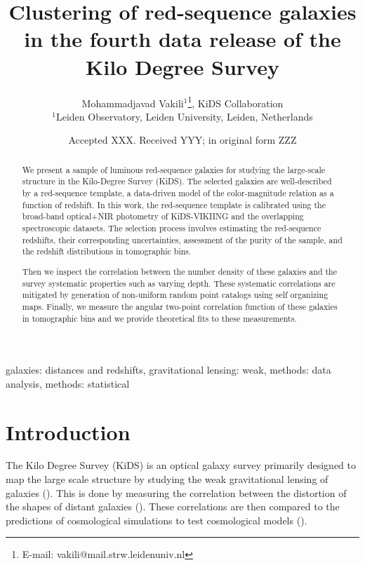\documentclass[fleqn,usenatbib,useAMS]{mnras}
\title[KiDS LRGs]{Clustering of red-sequence galaxies in the fourth data release of the Kilo Degree Survey}
\author[M. Vakili et al.]{
Mohammadjavad Vakili$^{1}$\thanks{E-mail: vakili@mail.strw.leidenuniv.nl}, KiDS Collaboration\\
$^{1}$Leiden Observatory, Leiden University, Leiden, Netherlands
}
\date{Accepted XXX. Received YYY; in original form ZZZ}
\begin{document}
\label{firstpage}
\pagerange{\pageref{firstpage}--\pageref{lastpage}}
\maketitle

\begin{abstract}

We present a sample of luminous red-sequence galaxies for studying the large-scale structure in the Kilo-Degree Survey (KiDS). The selected galaxies are well-described by a red-sequence template, a data-driven model of the color-magnitude relation as a function of redshift. In this work, the red-sequence template is calibrated using the broad-band optical+NIR photometry of KiDS-VIKIING and the overlapping spectroscopic datasets.    
The selection process involves estimating the red-sequence redshifts, their corresponding uncertainties, assessment of the purity of the sample, and the redshift distributions in tomographic bins.

Then we inspect the correlation between the number density of these galaxies and the survey systematic properties such as varying depth. These systematic correlations are mitigated by generation of non-uniform random point catalogs using self organizing maps. Finally, we measure the angular two-point correlation function of these galaxies in tomographic bins and we provide theoretical fits to these measurements. 

\end{abstract}

\begin{keywords}
galaxies: distances and redshifts, gravitational lensing: weak, methods: data analysis, methods: statistical
\end{keywords}


\section{Introduction}

The Kilo Degree Survey (KiDS) is an optical galaxy survey primarily designed to map the large scale structure by studying the weak gravitational lensing of galaxies (\citealt{kuijken2015, kuijken2019}). This is done by measuring the correlation between the distortion of the shapes of distant galaxies (\citealt{hendrick2017,hendrik2018}). These correlations are then compared to the predictions of cosmological simulations to test cosmological models (\citealt{heymans2013,jee2016,hendrick2017,joudaki2017,troxel2017,joudaki2019, hikage2019}). 
\end{document}
